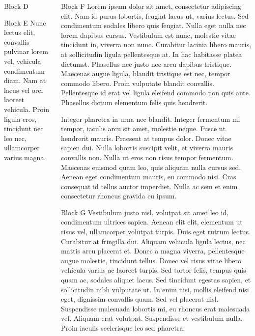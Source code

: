 \documentclass{beamer}
\begin{document}
\begin{frame}
\begin{columns}[t]
\begin{column}{.3\paperwidth}
\begin{block}{Block D}
		\end{block}
		\vfill
		\begin{block}{Block E}
			Nunc lectus elit, convallis pulvinar lorem vel, vehicula condimentum diam. Nam at lacus vel orci laoreet vehicula. Proin ligula eros, tincidunt nec leo nec, ullamcorper varius magna. 
		\end{block}
	\end{column}
		
	\begin{column}{.3\paperwidth}
		\begin{block}{Block F}
			 Lorem ipsum dolor sit amet, consectetur adipiscing elit. Nam id purus lobortis, feugiat lacus ut, varius lectus. Sed condimentum sodales libero quis feugiat. Nulla eget nulla nec lorem dapibus cursus. Vestibulum est nunc, molestie vitae tincidunt in, viverra non nunc. Curabitur lacinia libero mauris, at sollicitudin ligula pellentesque at. In hac habitasse platea dictumst. Phasellus nec justo nec arcu dapibus tristique. Maecenas augue ligula, blandit tristique est nec, tempor commodo libero. Proin vulputate blandit convallis. Pellentesque id erat vel ligula eleifend commodo non quis ante. Phasellus dictum elementum felis quis hendrerit.

			Integer pharetra in urna nec blandit. Integer fermentum mi tempor, iaculis arcu sit amet, molestie neque. Fusce ut hendrerit mauris. Praesent at tempus dolor. Donec vitae sapien dui. Nulla lobortis suscipit velit, et viverra mauris convallis non. Nulla ut eros non risus tempor fermentum. Maecenas euismod quam leo, quis aliquam nulla cursus sed. Aenean eget condimentum mauris, eu commodo nisi. Cras consequat id tellus auctor imperdiet. Nulla ac sem et enim consectetur rhoncus gravida eu ipsum. 
		\end{block}
		\vfill
		\baselineskip %
		\begin{block}{Block G}
			 Vestibulum justo nisl, volutpat sit amet leo id, condimentum ultrices sapien. Aenean elit elit, elementum ut risus vel, ullamcorper volutpat turpis. Duis eget rutrum lectus. Curabitur at fringilla dui. Aliquam vehicula ligula lectus, nec mattis arcu placerat et. Donec a magna viverra, pellentesque augue molestie, tincidunt tellus. Donec vel risus vitae libero vehicula varius ac laoreet turpis. Sed tortor felis, tempus quis quam ac, sodales aliquet lacus. Sed tincidunt egestas sapien, et sollicitudin nibh vulputate ut. In enim nisi, mollis eleifend nisi eget, dignissim convallis quam. Sed vel placerat nisl. Suspendisse malesuada lobortis mi, eu rhoncus erat malesuada vel. Aliquam erat volutpat. Suspendisse et vestibulum nulla. Proin iaculis scelerisque leo sed pharetra.
			

\end{block}
\end{column}
\end{columns}
\end{frame}
\end{document}
